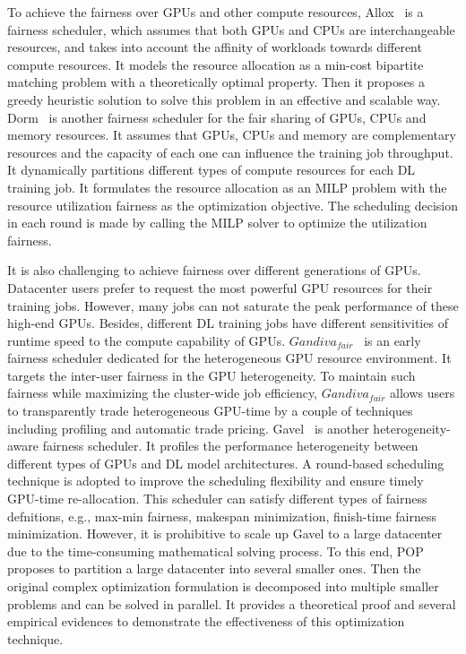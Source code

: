 To achieve the fairness over GPUs and other compute resources, Allox~\cite{Allox} is a fairness scheduler, which
assumes that both GPUs and CPUs are interchangeable resources, and takes into account the affinity of workloads towards different compute resources. It models the resource allocation as a min-cost bipartite matching problem with a theoretically optimal property. Then it proposes a greedy heuristic solution to solve this problem in an effective and scalable way. Dorm~\cite{Dorm} is another fairness scheduler for the fair sharing of GPUs, CPUs and memory resources. It assumes
that GPUs, CPUs and memory are complementary resources and the capacity of each one can influence the training job throughput.
It dynamically partitions different types of compute resources for each DL training job. It formulates the resource allocation as an MILP problem with the resource utilization fairness as the optimization objective. The scheduling decision in each round is made by calling the MILP solver to optimize the utilization fairness.

It is also challenging to achieve fairness over different generations of GPUs. Datacenter users prefer to request the most powerful GPU resources for their training jobs. However, many jobs can not saturate the peak performance of these high-end GPUs. Besides, different DL training jobs have different sensitivities of runtime speed to the compute capability of GPUs. $Gandiva_{fair}$~\cite{Gandivafair} is an early fairness scheduler dedicated for the heterogeneous GPU resource environment. It targets the inter-user fairness in the GPU heterogeneity.
To maintain such fairness while maximizing the cluster-wide job efficiency, $Gandiva_{fair}$ allows users to transparently trade heterogeneous GPU-time by a couple of techniques including profiling and automatic trade pricing.
Gavel~\cite{Gavel} is another heterogeneity-aware fairness scheduler. It profiles the performance heterogeneity between different types of GPUs and DL model architectures. A round-based scheduling technique is adopted to improve the scheduling flexibility and ensure timely GPU-time re-allocation. This scheduler can satisfy different types of fairness defnitions, e.g., max-min fairness, makespan minimization, finish-time fairness minimization. However, it is prohibitive to scale up Gavel to a large datacenter due to the time-consuming mathematical solving process. To this end, POP~\cite{POP} proposes to partition a large datacenter into several smaller ones. Then the original complex optimization formulation is decomposed into multiple smaller problems and can be solved in parallel. It provides a theoretical proof and several empirical evidences to demonstrate the effectiveness of this optimization technique.






